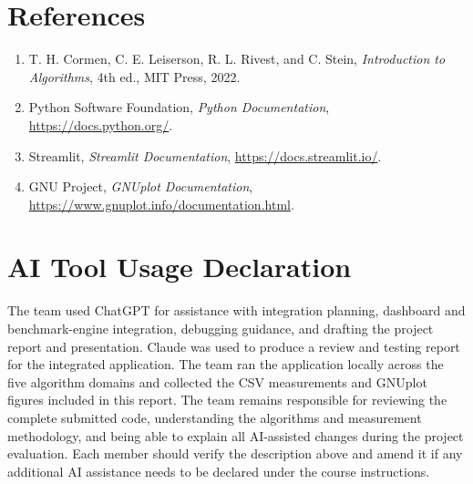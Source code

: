 \documentclass[11pt,a4paper]{report}
\begin{document}
\chapter*{References}
\begin{enumerate}
    \item T. H. Cormen, C. E. Leiserson, R. L. Rivest, and C. Stein,
    \textit{Introduction to Algorithms}, 4th ed., MIT Press, 2022.
    \item Python Software Foundation, \textit{Python Documentation},
    \url{https://docs.python.org/}.
    \item Streamlit, \textit{Streamlit Documentation},
    \url{https://docs.streamlit.io/}.
    \item GNU Project, \textit{GNUplot Documentation},
    \url{https://www.gnuplot.info/documentation.html}.
\end{enumerate}

\chapter*{AI Tool Usage Declaration}
The team used ChatGPT for assistance with integration planning, dashboard
and benchmark-engine integration, debugging guidance, and drafting the project
report and presentation. Claude was used to produce a review and testing report
for the integrated application. The team ran the application locally across
the five algorithm domains and collected the CSV measurements and GNUplot
figures included in this report. The team remains responsible for reviewing
the complete submitted code, understanding the algorithms and measurement
methodology, and being able to explain all AI-assisted changes during the
project evaluation. Each member should verify the description above and
amend it if any additional AI assistance needs to be declared under the course
instructions.
\end{document}
